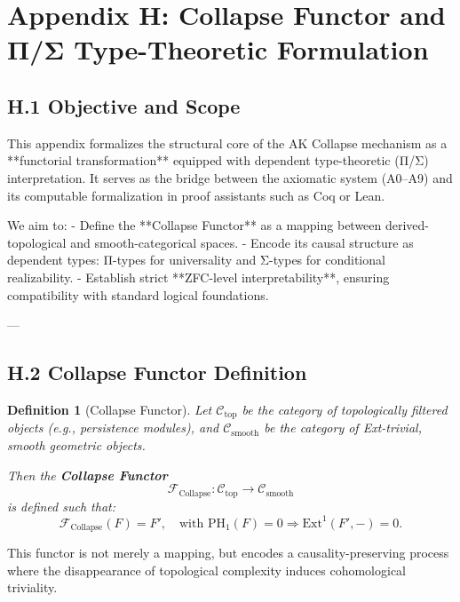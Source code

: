 \documentclass[11pt]{article}
\newtheorem{definition}[theorem]{Definition}
\begin{document}

\section*{Appendix H: Collapse Functor and Π/Σ Type-Theoretic Formulation}

\subsection*{H.1 Objective and Scope}

This appendix formalizes the structural core of the AK Collapse mechanism as a **functorial transformation** equipped with dependent type-theoretic (Π/Σ) interpretation. It serves as the bridge between the axiomatic system (A0–A9) and its computable formalization in proof assistants such as Coq or Lean.

We aim to:
- Define the **Collapse Functor** as a mapping between derived-topological and smooth-categorical spaces.
- Encode its causal structure as dependent types: Π-types for universality and Σ-types for conditional realizability.
- Establish strict **ZFC-level interpretability**, ensuring compatibility with standard logical foundations.

---

\subsection*{H.2 Collapse Functor Definition}

\begin{definition}[Collapse Functor]
Let $\mathcal{C}_{\text{top}}$ be the category of topologically filtered objects (e.g., persistence modules), and $\mathcal{C}_{\text{smooth}}$ be the category of Ext-trivial, smooth geometric objects.

Then the \textbf{Collapse Functor}
\[
\mathcal{F}_{\text{Collapse}} : \mathcal{C}_{\text{top}} \to \mathcal{C}_{\text{smooth}}
\]
is defined such that:
\[
\mathcal{F}_{\text{Collapse}}(F) = F', \quad \text{with } \mathrm{PH}_1(F) = 0 \Rightarrow \mathrm{Ext}^1(F',-) = 0.
\]
\end{definition}

This functor is not merely a mapping, but encodes a causality-preserving process where the disappearance of topological complexity induces cohomological triviality.
\end{document}
